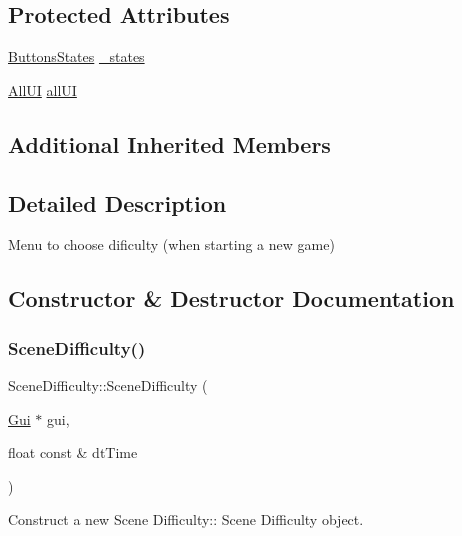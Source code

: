 \subsection*{Protected Attributes}
\begin{DoxyCompactItemize}
\item 
\hyperlink{struct_scene_difficulty_1_1_buttons_states}{Buttons\+States} \hyperlink{class_scene_difficulty_a183823618eb968594b8432f9e0dfe53c}{\+\_\+states}
\item 
\hyperlink{struct_scene_difficulty_1_1_all_u_i}{All\+UI} \hyperlink{class_scene_difficulty_ad54978b6604447154051380bcd0ce404}{all\+UI}
\end{DoxyCompactItemize}
\subsection*{Additional Inherited Members}


\subsection{Detailed Description}
Menu to choose dificulty (when starting a new game) 

\subsection{Constructor \& Destructor Documentation}
\mbox{\label{class_scene_difficulty_a15de9e867dd52a66a55c8e80e50e8e82}} 
\subsubsection{\texorpdfstring{Scene\+Difficulty()}{SceneDifficulty()}\hspace{0.1cm}{\footnotesize\ttfamily [1/2]}}
{\footnotesize\ttfamily Scene\+Difficulty\+::\+Scene\+Difficulty (\begin{DoxyParamCaption}\item[{\hyperlink{class_gui}{Gui} $\ast$}]{gui,  }\item[{float const \&}]{dt\+Time }\end{DoxyParamCaption})}



Construct a new Scene Difficulty\+:\+: Scene Difficulty object. 



